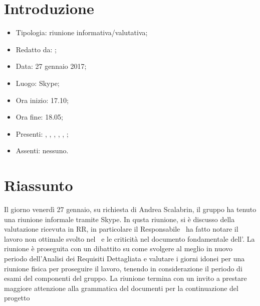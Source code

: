 \section{Introduzione}

	\begin{itemize}
		\item Tipologia: riunione informativa/valutativa;
		\item Redatto da: \MC;
		\item Data: 27 gennaio 2017;
		\item Luogo: Skype;
		\item Ora inizio: 17.10;
		\item Ora fine: 18.05;
		\item Presenti: \AS, \DS, \MC, \NS, \DAN, \AN;	
		\item Assenti: nessuno.	
	\end{itemize}

\section{Riassunto}
Il giorno venerdì 27 gennaio, su richiesta di Andrea Scalabrin, il gruppo ha tenuto una riunione informale tramite Skype. In qusta riunione, si è discusso della valutazione ricevuta in RR, in particolare il Responsabile \AS\ ha fatto notare il lavoro non ottimale svolto nel \PdQ\ e le criticità nel documento fondamentale dell'\AdR. La riunione è proseguita con un dibattito su come svolgere al meglio in nuovo periodo dell'Analisi dei Requisiti Dettagliata e valutare i giorni idonei per una riunione fisica per proseguire il lavoro, tenendo in considerazione il periodo di esami del componenti del gruppo. La riunione termina con un invito a prestare maggiore attenzione alla grammatica del documenti per la continuazione del progetto
